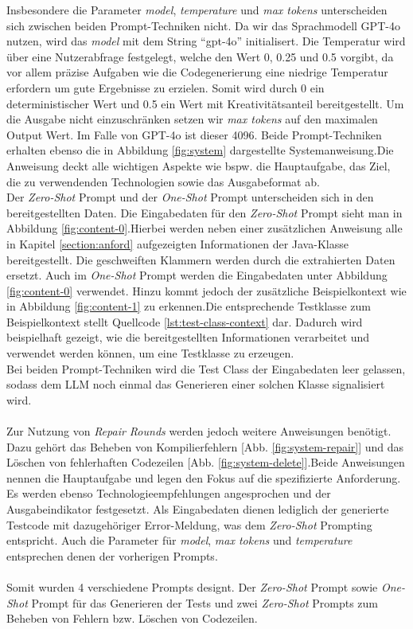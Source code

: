 Insbesondere die Parameter \textit{model}, \textit{temperature} und \textit{max tokens} unterscheiden sich zwischen beiden Prompt-Techniken nicht. Da wir das Sprachmodell GPT-4o nutzen, wird das \textit{model} mit dem String ``gpt-4o'' initialisert. Die Temperatur wird über eine Nutzerabfrage festgelegt, welche den Wert 0, 0.25 und 0.5 vorgibt, da vor allem präzise Aufgaben wie die Codegenerierung eine niedrige Temperatur erfordern um gute Ergebnisse zu erzielen. \cite*{renzeEffectSamplingTemperature2024} Somit wird durch 0 ein deterministischer Wert und 0.5 ein Wert mit Kreativitätsanteil bereitgestellt. Um die Ausgabe nicht einzuschränken setzen wir \textit{max tokens} auf den maximalen Output Wert. Im Falle von GPT-4o ist dieser 4096. Beide Prompt-Techniken erhalten ebenso die in Abbildung \ref{fig:system} dargestellte Systemanweisung.Die Anweisung deckt alle wichtigen Aspekte wie bspw. die Hauptaufgabe, das Ziel, die zu verwendenden Technologien sowie das Ausgabeformat ab. \\
Der \textit{Zero-Shot} Prompt und der \textit{One-Shot} Prompt unterscheiden sich in den bereitgestellten Daten. Die Eingabedaten für den \textit{Zero-Shot} Prompt sieht man in Abbildung \ref{fig:content-0}.Hierbei werden neben einer zusätzlichen Anweisung alle in Kapitel \ref{section:anford} aufgezeigten Informationen der Java-Klasse bereitgestellt. Die geschweiften Klammern werden durch die extrahierten Daten ersetzt. Auch im \textit{One-Shot} Prompt werden die Eingabedaten unter Abbildung \ref{fig:content-0} verwendet. Hinzu kommt jedoch der zusätzliche Beispielkontext wie in Abbildung \ref{fig:content-1} zu erkennen.Die entsprechende Testklasse zum Beispielkontext stellt Quellcode \ref{lst:test-class-context} dar. Dadurch wird beispielhaft gezeigt, wie die bereitgestellten Informationen verarbeitet und verwendet werden können, um eine Testklasse zu erzeugen.\\
 Bei beiden Prompt-Techniken wird die Test Class der Eingabedaten leer gelassen, sodass dem LLM noch einmal das Generieren einer solchen Klasse signalisiert wird.\\\\
Zur Nutzung von \textit{Repair Rounds} werden jedoch weitere Anweisungen benötigt. Dazu gehört das Beheben von Kompilierfehlern [Abb. \ref{fig:system-repair}] und das Löschen von fehlerhaften Codezeilen [Abb. \ref{fig:system-delete}].Beide Anweisungen nennen die Hauptaufgabe und legen den Fokus auf die spezifizierte Anforderung. Es werden ebenso Technologieempfehlungen angesprochen und der Ausgabeindikator festgesetzt. Als Eingabedaten dienen lediglich der generierte Testcode mit dazugehöriger Error-Meldung, was dem \textit{Zero-Shot} Prompting entspricht. Auch die Parameter für \textit{model}, \textit{max tokens} und \textit{temperature} entsprechen denen der vorherigen Prompts.\\\\
Somit wurden 4 verschiedene Prompts designt. Der \textit{Zero-Shot} Prompt sowie \textit{One-Shot} Prompt für das Generieren der Tests und zwei \textit{Zero-Shot} Prompts zum Beheben von Fehlern bzw. Löschen von Codezeilen. 